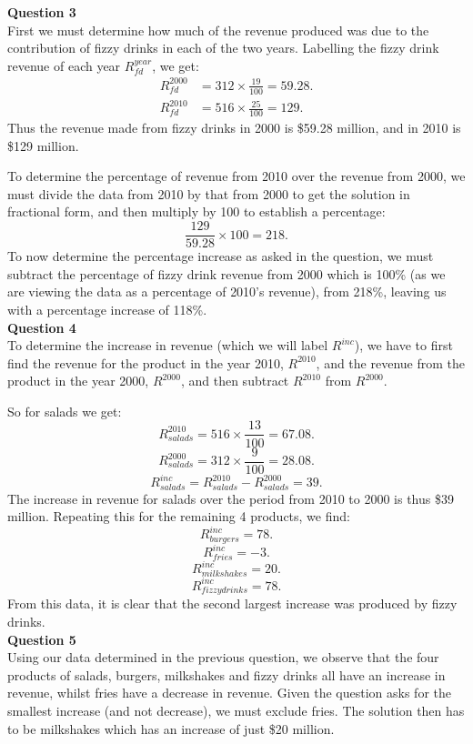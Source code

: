 \documentclass{article}
\begin{document}
\textbf{Question 3} \\
First we must determine how much of the revenue produced was due to the contribution of fizzy drinks in each of the two years. Labelling the fizzy drink revenue of each year $R_{fd}^{year}$, we get:
\begin{align*}
R_{fd}^{2000} &= 312 \times \frac{19}{100}=59.28.\\
R_{fd}^{2010} &= 516 \times \frac{25}{100}=129.
\end{align*} 
Thus the revenue made from fizzy drinks in 2000 is \$59.28 million, and in 2010 is \$129 million.

To determine the percentage of revenue from 2010 over the revenue from 2000, we must divide the data from 2010 by that from 2000 to get the solution in fractional form, and then multiply by 100 to establish a percentage:
$$\frac{129}{59.28} \times 100=218.$$
To now determine the percentage increase as asked in the question, we must subtract the percentage of fizzy drink revenue from 2000 which is 100\% (as we are viewing the data as a percentage of 2010's revenue), from 218\%, leaving us with a percentage increase of 118\%.\\


\textbf{Question 4}\\
To determine the increase in revenue (which we will label $R^{inc}$), we have to first find the revenue for the product in the year 2010, $R^{2010}$, and the revenue from the product in the year 2000, $R^{2000}$, and then subtract $R^{2010}$ from $R^{2000}$.

So for salads we get:
$$R^{2010}_{salads}=516 \times \frac{13}{100}=67.08.$$
$$R^{2000}_{salads}=312 \times \frac{9}{100}=28.08.$$
$$R^{inc}_{salads} = R^{2010}_{salads} - R^{2000}_{salads} = 39.$$
The increase in revenue for salads over the period from 2010 to 2000 is thus \$39 million.
Repeating this for the remaining 4 products, we find:
$$R^{inc}_{burgers}=78.$$
$$R^{inc}_{fries}=-3.$$
$$R^{inc}_{milkshakes}=20.$$
$$R^{inc}_{fizzy drinks}=78.$$
From this data, it is clear that the second largest increase was produced by fizzy drinks.\\

\textbf{Question 5}\\
Using our data determined in the previous question, we observe that the four products of salads, burgers, milkshakes and fizzy drinks all have an increase in revenue, whilst fries have a decrease in revenue. Given the question asks for the smallest increase (and not decrease), we must exclude fries. The solution then has to be milkshakes which has an increase of just \$20 million.\\
\end{document}
